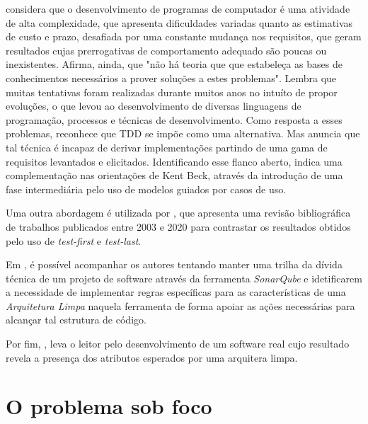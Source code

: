    considera que o desenvolvimento de programas de computador é uma atividade de alta complexidade, que apresenta dificuldades variadas quanto as estimativas de custo e prazo, desafiada por uma constante mudança nos requisitos, que geram resultados cujas prerrogativas de comportamento adequado são poucas ou inexistentes. Afirma, ainda, que "não há teoria que que estabeleça as bases de conhecimentos necessários a prover soluções a estes problemas". Lembra que muitas tentativas foram realizadas durante muitos anos no intuíto de propor evoluções, o que levou ao desenvolvimento de diversas linguagens de programação, processos e técnicas de desenvolvimento. Como resposta a esses problemas, reconhece que TDD se impõe como uma alternativa. Mas anuncia que tal técnica é incapaz de derivar implementações partindo de uma gama de requisitos levantados e elicitados. Identificando esse flanco aberto, indica uma complementação nas orientações de Kent Beck, através da introdução de uma fase intermediária pelo uso de modelos guiados por casos de uso.

  \cite{Santos2015}

  \cite{Aguilar2016}

  \cite{Gustavsson2017}

  \cite{Adhikari2019}

  \cite{Benato2021}
  Uma outra abordagem é utilizada por , que apresenta uma revisão bibliográfica de trabalhos publicados entre 2003 e 2020 para contrastar os resultados obtidos pelo uso de \emph{test-first} e \emph{test-last}.

  \cite{Beltrao2020}
  Em , é possível acompanhar os autores tentando manter uma trilha da dívida técnica de um projeto de software através da ferramenta \emph{SonarQube} e idetificarem a necessidade de implementar regras específicas para as características de uma \emph{Arquitetura Limpa} naquela ferramenta de forma apoiar as ações necessárias para alcançar tal estrutura de código.

  \cite{Souza2021}
  Por fim, , leva o leitor pelo desenvolvimento de um software real cujo resultado revela a presença dos atributos esperados por uma arquitera limpa.

\section{O problema sob foco}

